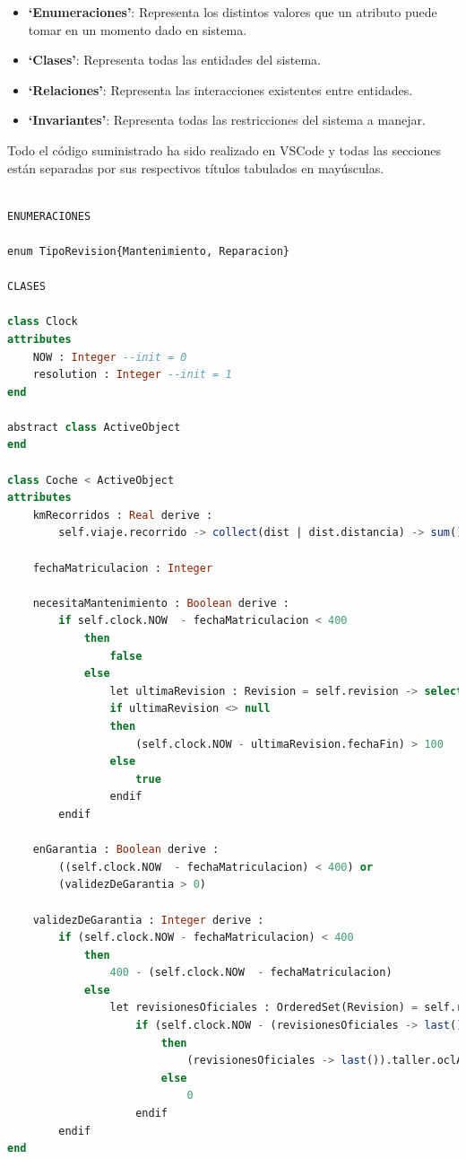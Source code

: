 \documentclass[12pt.a4paper]{article}
\begin{document}
\begin{itemize}
    \item \textbf{‘Enumeraciones’}: Representa los distintos valores que un atributo puede tomar en un momento dado en sistema.
    \item \textbf{‘Clases’}: Representa todas las entidades del sistema.
    \item \textbf{‘Relaciones’}: Representa las interacciones existentes entre entidades.
    \item \textbf{‘Invariantes’}: Representa todas las restricciones del sistema a manejar.
\end{itemize}
Todo el código suministrado ha sido realizado en VSCode y
todas las secciones están separadas por sus respectivos títulos tabulados en mayúsculas.
\vspace{1cm}
\begin{lstlisting}[style = useNormal,language=SQL, caption={Modelo de Sistema de Coches en USE}] 

ENUMERACIONES

enum TipoRevision{Mantenimiento, Reparacion}

CLASES 

class Clock
attributes
    NOW : Integer --init = 0            
    resolution : Integer --init = 1
end

abstract class ActiveObject
end

class Coche < ActiveObject
attributes
    kmRecorridos : Real derive :        
        self.viaje.recorrido -> collect(dist | dist.distancia) -> sum()
        
    fechaMatriculacion : Integer            

    necesitaMantenimiento : Boolean derive : 
        if self.clock.NOW  - fechaMatriculacion < 400 
            then
                false
            else
                let ultimaRevision : Revision = self.revision -> select(rev | rev.tipo = TipoRevision::Mantenimiento) -> sortedBy(r | r.fechaInicio) -> last() in
                if ultimaRevision <> null
                then
                    (self.clock.NOW - ultimaRevision.fechaFin) > 100
                else
                    true
                endif
        endif

    enGarantia : Boolean derive :             
        ((self.clock.NOW  - fechaMatriculacion) < 400) or
        (validezDeGarantia > 0)

    validezDeGarantia : Integer derive :   
        if (self.clock.NOW - fechaMatriculacion) < 400 
            then 
                400 - (self.clock.NOW  - fechaMatriculacion) 
            else
                let revisionesOficiales : OrderedSet(Revision) = self.revision -> select(rev | rev.taller.oclIsKindOf(Oficial)) -> sortedBy(rev | rev.fechaInicio) in
                    if (self.clock.NOW - (revisionesOficiales -> last()).fechaFin) < (revisionesOficiales -> last()).taller.oclAsType(Oficial).garantia
                        then
                            (revisionesOficiales -> last()).taller.oclAsType(Oficial).garantia - (self.clock.NOW - (revisionesOficiales -> last()).fechaFin)
                        else 
                            0
                    endif          
        endif 
end 


\end{lstlisting}
\end{document}
